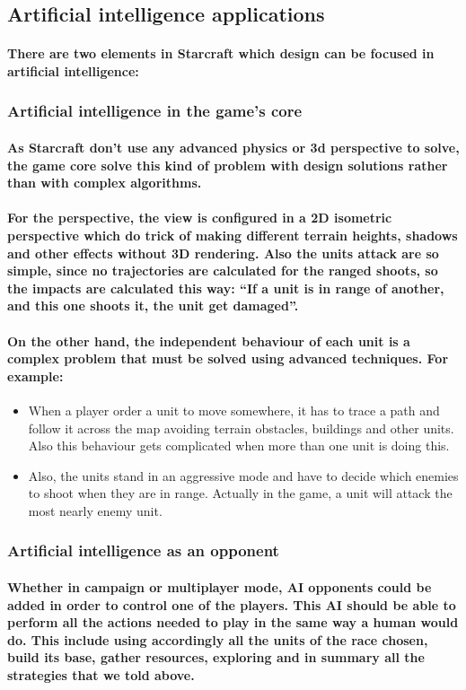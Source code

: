\documentclass[a4paper,10pt]{article}
\newcommand{\p}[1]{\paragraph{\indent\textnormal{#1}}}
\begin{document}
  \subsection{Artificial intelligence applications}

    \p{There are two elements in Starcraft which design can be focused in artificial intelligence:}

    \subsubsection{Artificial intelligence in the game's core}

      \p{As Starcraft don't use any advanced physics or 3d perspective to solve, the game core solve this kind of problem with design solutions rather than with complex algorithms.}

      \p{For the perspective, the view is configured in a 2D isometric perspective which do trick of making different terrain heights, shadows and other effects without 3D rendering. Also the units attack are so simple, since no trajectories are calculated for the ranged shoots, so the impacts are calculated this way: ``If a unit is in range of another, and this one shoots it, the unit get damaged''.}

      \p{On the other hand, the independent behaviour of each unit is a complex problem that must be solved using advanced techniques. For example:}

      \begin{itemize}
       \item When a player order a unit to move somewhere, it has to trace a path and follow it across the map avoiding terrain obstacles, buildings and other units. Also this behaviour gets complicated when more than one unit is doing this.
       \item Also, the units stand in an aggressive mode and have to decide which enemies to shoot when they are in range. Actually in the game, a unit will attack the most nearly enemy unit.
      \end{itemize}




    \subsubsection{Artificial intelligence as an opponent}

      \p{Whether in campaign or multiplayer mode, AI opponents could be added in order to control one of the players. This AI should be able to perform all the actions needed to play in the same way a human would do. This include using accordingly all the units of the race chosen, build its base, gather resources, exploring and in summary all the strategies that we told above.}
\end{document}
